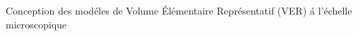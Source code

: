 \documentclass[final]{beamer}
\begin{document}
\begin{frame}
\begin{center}
\begin{minipage}{\textwidth}
\begin{exampleblock}{\rule[-0.6ex]{0pt}{50pt}\centering\LARGE Conception des mod\'eles de Volume \'El\'ementaire Repr\'esentatif (VER) \'a l'\'echelle microscopique}
\begin{columns}
\begin{column}{0.3\textwidth}
\begin{center}
\end{center}
\end{column}
\begin{column}{0.15\textwidth}  %
    \begin{center}
\captionsetup[subfigure]{labelformat=empty}
\begin{figure}[!h]
\centering
{}
\end{figure}
     \end{center}
\end{column}
\begin{column}{0.125\textwidth}

\end{column}
\end{columns}
\end{exampleblock}
\end{minipage}
\end{center}
\end{frame}
\end{document}
